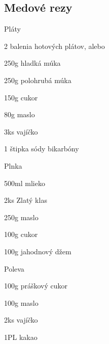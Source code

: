 \setcounter{step}{0}
\subsection{Medové rezy}

\begin{ingredient}
\begin{main}
\item
\end{main}
\begin{subingredient}{Pláty}
	\item 2 balenia hotových plátov, alebo
	\item 250g hladká múka
  \item 250g polohrubá múka
  \item 150g cukor
  \item 80g maslo
  \item 3ks vajíčko
  \item 1 štipka sódy bikarbóny
\end{subingredient}
\begin{subingredient}{Plnka}
	\item 500ml mlieko
	\item 2ks Zlatý klas
	\item 250g maslo
	\item 100g cukor
  \item 100g jahodnový džem
\end{subingredient}
\begin{subingredient}{Poleva}
	\item 100g práškový cukor
	\item 100g maslo
  \item 2ks vajíčko
  \item 1PL kakao
\end{subingredient}
\end{ingredient}%
